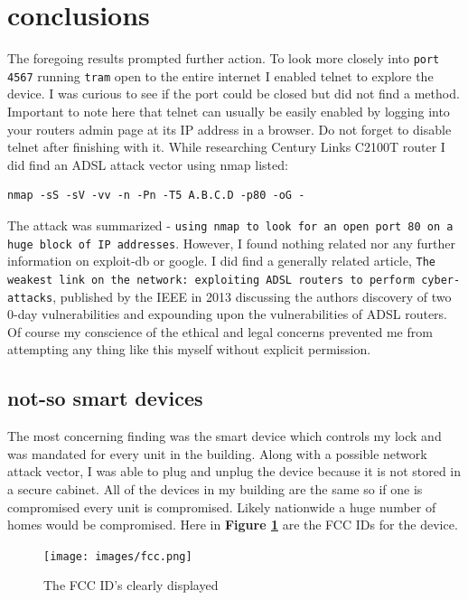 \documentclass[10pt]{article}
\begin{document}
\section*{conclusions}
The foregoing results prompted further action. To look more closely into \verb|port 4567| running \verb|tram| open to the entire internet I enabled telnet to
explore the device. I was curious to see if the port could be closed but did not find a method. Important to note here that telnet can usually be easily enabled by 
logging into your routers admin page at its IP address in a browser. Do not forget to disable telnet after finishing with it. While researching Century Links C2100T router 
I did find an ADSL attack vector using nmap listed:\cite{techni}
\begin{verbatim}
nmap -sS -sV -vv -n -Pn -T5 A.B.C.D -p80 -oG -
\end{verbatim}
The attack was summarized - \verb|using nmap to look for an open port 80 on a huge block of IP addresses|.\cite{techni}
However, I found nothing related nor any further information on exploit-db or google. I did find a generally related 
article, \verb|The weakest link on the network: exploiting ADSL routers to perform cyber-attacks|, published by the IEEE 
in 2013 discussing the authors discovery of two 0-day vulnerabilities and expounding upon the vulnerabilities of ADSL routers.\cite{journal} Of course my conscience of the ethical 
and legal concerns prevented me from attempting any thing like this myself without explicit permission.

\subsection*{not-so smart devices}
The most concerning finding was the smart device which controls my lock and was mandated for every unit in the building. Along with a possible network attack vector, 
I was able to plug and unplug the device because it is not stored in a secure cabinet. All of the devices in my building are the same so if one is compromised 
every unit is compromised. Likely nationwide a huge number of homes would be compromised. Here in \textbf{Figure \ref{fcc image}} are the FCC IDs for the device.
\begin{figure}[H]
\centering
\texttt{[image: images/fcc.png]}
\caption{The FCC ID's clearly displayed}\label{fcc image}
\end{figure}
\end{document}

